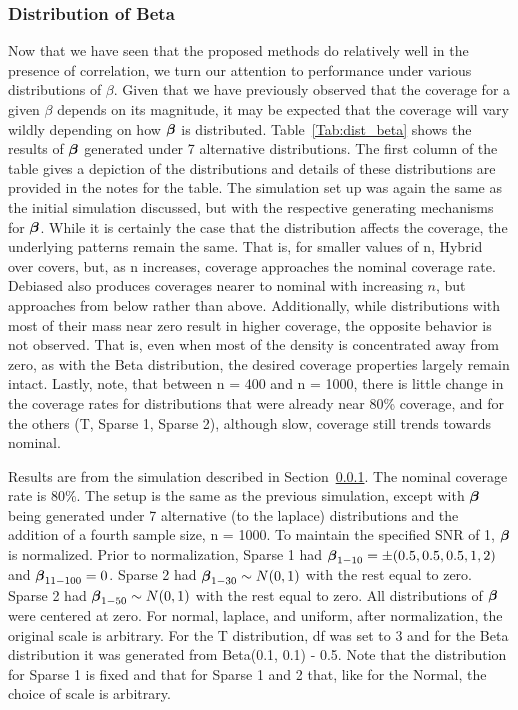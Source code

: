 \subsubsection{Distribution of Beta}\label{Sec:Distribution}

Now that we have seen that the proposed methods do relatively well in the presence of correlation, we turn our attention to performance under various distributions of $\beta$. Given that we have previously observed that the coverage for a given $\beta$ depends on its magnitude, it may be expected that the coverage will vary wildly depending on how $\boldsymbol{\beta}$ is distributed. Table~\ref{Tab:dist_beta} shows the results of $\boldsymbol{\beta}$ generated under 7 alternative distributions. The first column of the table gives a depiction of the distributions and details of these distributions are provided in the notes for the table. The simulation set up was again the same as the initial simulation discussed, but with the respective generating mechanisms for $\boldsymbol{\beta}$. While it is certainly the case that the distribution affects the coverage, the underlying patterns remain the same. That is, for smaller values of n, Hybrid over covers, but, as n increases, coverage approaches the nominal coverage rate. Debiased also produces coverages nearer to nominal with increasing $n$, but approaches from below rather than above. Additionally, while distributions with most of their mass near zero result in higher coverage, the opposite behavior is not observed. That is, even when most of the density is concentrated away from zero, as with the Beta distribution, the desired coverage properties largely remain intact. Lastly, note, that between n = 400 and n = 1000, there is little change in the coverage rates for distributions that were already near 80\% coverage, and for the others (T, Sparse 1, Sparse 2), although slow, coverage still trends towards nominal.

\begin{table}[hbtp]
  \centering
  
  \caption{\label{Tab:dist_beta} Results are from the simulation described in Section~\ref{Sec:Distribution}. The nominal coverage rate is 80\%. The setup is the same as the previous simulation, except with $\boldsymbol{\beta}$ being generated under 7 alternative (to the laplace) distributions and the addition of a fourth sample size, n = 1000. To maintain the specified SNR of 1, $\boldsymbol{\beta}$ is normalized. Prior to normalization, Sparse 1 had $\boldsymbol{\beta}_{1-10} = \pm(0.5, 0.5, 0.5, 1, 2)$ and $\boldsymbol{\beta}_{11-100} = 0$. Sparse 2 had $\boldsymbol{\beta}_{1-30} \sim N(0, 1)$ with the rest equal to zero.  Sparse 2 had $\boldsymbol{\beta}_{1-50} \sim N(0, 1)$ with the rest equal to zero. All distributions of $\boldsymbol{\beta}$ were centered at zero. For normal, laplace, and uniform, after normalization, the original scale is arbitrary. For the T distribution, df was set to 3 and for the Beta distribution it was generated from Beta(0.1, 0.1) - 0.5. Note that the distribution for Sparse 1 is fixed and that for Sparse 1 and 2 that, like for the Normal, the choice of scale is arbitrary.}
\end{table}

